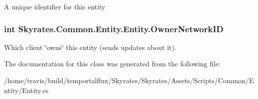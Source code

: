 A unique identifier for this entity 

\hypertarget{class_skyrates_1_1_common_1_1_entity_1_1_entity_a855cbcf588c2b4c490c2ddc157e11029}{
\subsubsection[{Owner\-Network\-I\-D}]{\setlength{\rightskip}{0pt plus 5cm}int Skyrates.\-Common.\-Entity.\-Entity.\-Owner\-Network\-I\-D}}\label{class_skyrates_1_1_common_1_1_entity_1_1_entity_a855cbcf588c2b4c490c2ddc157e11029}


Which client \char`\"{}owns\char`\"{} this entity (sends updates about it). 



The documentation for this class was generated from the following file\-:\begin{DoxyCompactItemize}
\item 
/home/travis/build/temportalflux/\-Skyrates/\-Skyrates/\-Assets/\-Scripts/\-Common/\-Entity/Entity.\-cs\end{DoxyCompactItemize}
